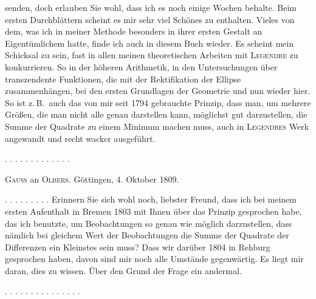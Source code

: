senden, doch erlauben Sie wohl, dass ich es noch einige Wochen behalte. Beim ersten Durchblättern scheint es mir sehr viel Schönes zu enthalten. Vieles von dem, was ich in meiner Methode besonders in ihrer ersten Gestalt an Eigentümlichem hatte, finde ich auch in diesem Buch wieder. Es scheint mein Schicksal zu sein, fast in allen meinen theoretischen Arbeiten mit \textsc{Legendre} zu konkurrieren. So in der höheren Arithmetik, in den Untersuchungen über transzendente Funktionen, die mit der Rektifikation der Ellipse zusammenhängen, bei den ersten Grundlagen der Geometrie und nun wieder hier. So ist z.\,B.\ auch das von mir seit 1794 gebrauchte Prinzip, dass man, um mehrere Größen, die man nicht alle genau darstellen kann, möglichst gut darzustellen, die Summe der Quadrate zu einem Minimum machen muss, auch in \textsc{Legendres} Werk angewandt und recht wacker ausgeführt.

\begin{center}
. . . . . . . . . . . . .
\end{center}

\begin{center}
\textsc{Gauss} an \textsc{Olbers}. Göttingen, 4. Oktober 1809.
\end{center}

. . . . . . . . . Erinnern Sie sich wohl noch, liebster Freund, dass ich bei meinem ersten Aufenthalt in Bremen 1803 mit Ihnen über das Prinzip gesprochen habe, das ich benutzte, um Beobachtungen so genau wie möglich darzustellen, dass nämlich bei gleichem Wert der Beobachtungen die Summe der Quadrate der Differenzen ein Kleinstes sein muss? Dass wir darüber 1804 in Rehburg gesprochen haben, davon sind mir noch alle Umstände gegenwärtig. Es liegt mir daran, dies zu wissen. Über den Grund der Frage ein andermal.

\begin{center}
. . . . . . . . . . . . . . .
\end{center}
